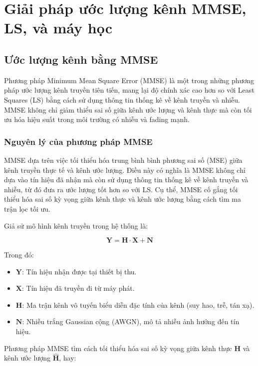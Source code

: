 \section{Giải pháp ước lượng kênh MMSE, LS, và máy học}

\subsection{Ước lượng kênh bằng MMSE}

Phương pháp Minimum Mean Square Error (MMSE) là một trong những phương pháp ước lượng kênh truyền tiên tiến, mang lại độ chính xác cao hơn so với Least Squares (LS) bằng cách sử dụng thông tin thống kê về kênh truyền và nhiễu. 
MMSE không chỉ giảm thiểu sai số giữa kênh ước lượng và kênh thực mà còn tối ưu hóa hiệu suất trong môi trường có nhiễu và fading mạnh. 

\subsubsection{Nguyên lý của phương pháp MMSE}

MMSE dựa trên việc tối thiểu hóa trung bình bình phương sai số (MSE) giữa kênh truyền thực tế và kênh ước lượng. 
Điều này có nghĩa là MMSE không chỉ dựa vào tín hiệu đã nhận mà còn sử dụng thông tin thống kê về kênh truyền và nhiễu, 
từ đó đưa ra ước lượng tốt hơn so với LS. 
Cụ thể, MMSE cố gắng tối thiểu hóa sai số kỳ vọng giữa kênh thực và kênh ước lượng bằng cách tìm ma trận lọc tối ưu.

Giả sử mô hình kênh truyền trong hệ thống là:

\begin{equation}
    \bm{Y} = \bm{H} \cdot \bm{X} + \bm{N}
\end{equation}

Trong đó:
\begin{itemize}
    \item $\bm{Y}$: Tín hiệu nhận được tại thiết bị thu.
    \item $\bm{X}$: Tín hiệu đã truyền đi từ máy phát.
    \item $\bm{H}$: Ma trận kênh vô tuyến biểu diễn đặc tính của kênh (suy hao, trễ, tán xạ).
    \item $\bm{N}$: Nhiễu trắng Gaussian cộng (AWGN), mô tả nhiễu ảnh hưởng đến tín hiệu.
\end{itemize}

Phương pháp MMSE tìm cách tối thiểu hóa sai số kỳ vọng giữa kênh thực $\bm{H}$ và kênh ước lượng $\bm{\hat{H}}$, hay:

